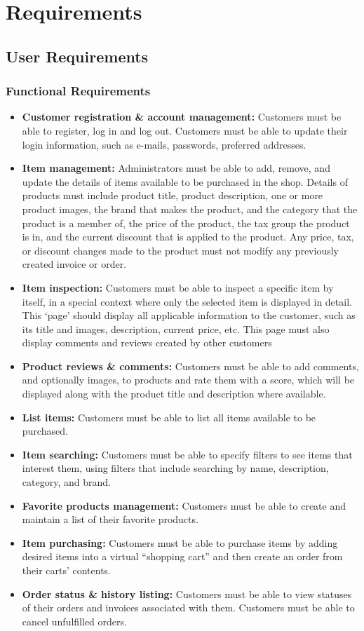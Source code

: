 \documentclass[a4paper,journal]{IEEEtran}
\begin{document}
\section{Requirements}
\subsection{User Requirements}
\subsubsection{Functional Requirements}
\begin{itemize}
  \item \textbf{Customer registration \& account management:}
    Customers must be able to register, log in and log out. Customers
    must be able to update their login information, such as e-mails, passwords,
    preferred addresses.
  \item \textbf{Item management:} Administrators must be
    able to add, remove, and update the details of items available to be
    purchased in the shop. Details of products must include product title,
    product description, one or more product images, the brand that makes the
    product, and the category that the product is a member of, the price of the
    product, the tax
    group the product is in, and the current discount that is applied to the
    product. Any price, tax, or discount changes made to the product must not
    modify any previously created invoice or order.
  \item \textbf{Item inspection:} Customers must be able
    to inspect a specific item by itself, in a special context where only the
    selected item is displayed in detail. This ‘page’ should display all applicable
    information to the customer, such as its title and images, description, current
    price, etc. This page must also display comments and reviews created by other
    customers
  \item \textbf{Product reviews \& comments:} Customers
    must be able to add comments, and optionally images, to products and rate them
    with a score, which will be displayed along with the product title and
    description where available.
  \item \textbf{List items:} Customers must be able to
   list all items available to be purchased.
  \item \textbf{Item searching:} Customers must be able to
    specify filters to see items that interest them, using filters that include
    searching by name, description, category, and brand.
  \item \textbf{Favorite products management:} Customers
   must be able to create and maintain a list of their favorite products.
  \item \textbf{Item purchasing:} Customers must be able
    to purchase items by adding desired items into a virtual ``shopping cart''
    and then create an order from their carts' contents.
  \item \textbf{Order status \& history listing:}
    Customers must be able to view statuses of
    their orders and invoices associated with them. Customers must be able to
    cancel unfulfilled orders.
\end{itemize}
\end{document}
